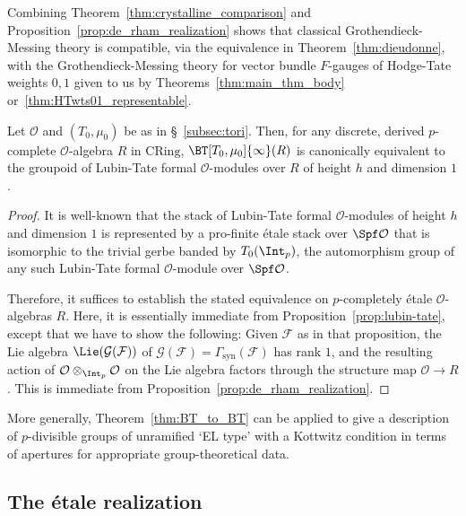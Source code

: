 \documentclass[10pt]{amsart}
\begin{document}
\begin{remark}
\label{rem:groth_mess_compat}
Combining Theorem~\ref{thm:crystalline_comparison} and Proposition~\ref{prop:de_rham_realization} shows that classical Grothendieck-Messing theory is compatible, via the equivalence in Theorem~\ref{thm:dieudonne}, with the Grothendieck-Messing theory for vector bundle $F$-gauges of Hodge-Tate weights $0,1$ given to us by Theorems~\ref{thm:main_thm_body} or~\ref{thm:HTwts01_representable}.
\end{remark}  

\begin{proposition}
\label{prop:lubin-tate_groups}
Let $\mathcal{O}$ and $(T_0,\mu_0)$ be as in \S~\ref{subsec:tori}. Then, for any discrete, derived $p$-complete $\mathcal{O}$-algebra $R$ in $\mathrm{CRing}$, $\BT[T_0,\mu_0]{\infty}(R)$ is canonically equivalent to the groupoid of Lubin-Tate formal $\mathcal{O}$-modules over $R$ of height $h$ and dimension $1$.
\end{proposition} 
\begin{proof}
It is well-known that the stack of Lubin-Tate formal $\mathcal{O}$-modules of height $h$ and dimension $1$ is represented by a pro-finite \'etale stack over $\Spf \mathcal{O}$ that is isomorphic to the trivial gerbe banded by $T_0(\Int_p)$, the automorphism group of any such Lubin-Tate formal $\mathcal{O}$-module over $\Spf \mathcal{O}$. 

Therefore, it suffices to establish the stated equivalence on $p$-completely \'etale $\mathcal{O}$-algebras $R$. Here, it is essentially immediate from Proposition~\ref{prop:lubin-tate}, except that we have to show the following: Given $\mathcal{F}$ as in that proposition, the Lie algebra $\Lie(\mathcal{G}(\mathcal{F}))$ of $\mathcal{G}(\mathcal{F}) = \Gamma_{\mathrm{syn}}(\mathcal{F})$ has rank $1$, and the resulting action of $\mathcal{O}\otimes_{\Int_p}\mathcal{O}$ on the Lie algebra factors through the structure map $\mathcal{O}\to R$. This is immediate from Proposition~\ref{prop:de_rham_realization}.
\end{proof}

\begin{remark}
More generally, Theorem~\ref{thm:BT_to_BT} can be applied to give a description of $p$-divisible groups of unramified `EL type' with a Kottwitz condition in terms of apertures for appropriate group-theoretical data.
\end{remark}

\subsection{The \'etale realization}
\label{subsec:etale}
\end{document}
